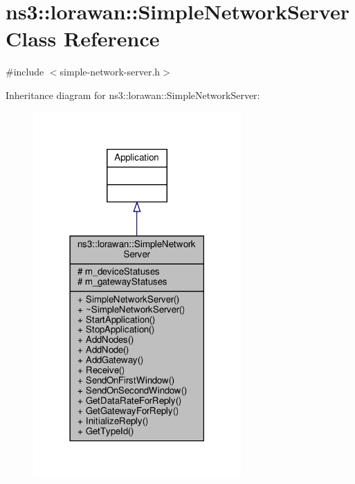 \hypertarget{classns3_1_1lorawan_1_1SimpleNetworkServer}{}\section{ns3\+:\+:lorawan\+:\+:Simple\+Network\+Server Class Reference}
\label{classns3_1_1lorawan_1_1SimpleNetworkServer}


{\ttfamily \#include $<$simple-\/network-\/server.\+h$>$}



Inheritance diagram for ns3\+:\+:lorawan\+:\+:Simple\+Network\+Server\+:
\nopagebreak
\begin{figure}[H]
\begin{center}
\leavevmode
\includegraphics[width=225pt]{classns3_1_1lorawan_1_1SimpleNetworkServer__inherit__graph}
\end{center}
\end{figure}


